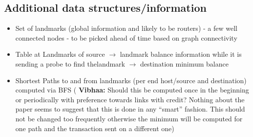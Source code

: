 \documentclass[a4paper]{article}
\newcommand{\vls}[1]{{\color{blue} \textbf{Vibhaa:} {#1}}}
\begin{document}
\subsection{Additional data structures/information}
    \begin{itemize}
        \item Set of landmarks (global information and likely to be routers) - a few well connected nodes - 
            to be picked ahead of time based on graph connectivity
        \item Table at Landmarks of source $\rightarrow$ landmark balance information 
            while it is sending a probe to find thelandmark $\rightarrow$ destination minimum balance
        \item Shortest Paths to and from landmarks (per end host/source and destination)
            computed via BFS (\vls{Should this be computed once in
                the beginning or periodically with preference towards links with credit? Nothing about
            the paper seems to suggest that this is done in any ``smart'' fashion. This should not be changed
        too frequently otherwise the minimum will be computed for one path and the transaction sent on 
    a different one})
    \end{itemize}

    
\end{document}
